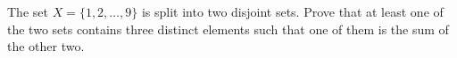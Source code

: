The set $X=\{1,2,\dots,9\}$ is split into two disjoint sets. Prove that at least one of the two sets contains three distinct elements such that one of them is the sum of the other two.
